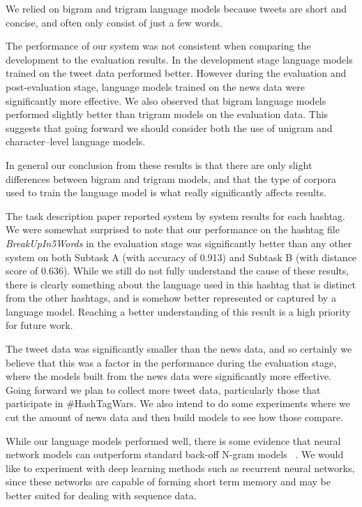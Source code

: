 \documentclass[11pt,a4paper]{article}
\begin{document}
We relied on bigram and trigram language models because 
tweets are short and concise, and often only consist of just
a few words. 

The performance of our system was not consistent when
comparing the development to the evaluation results.
In the development stage language models trained on the
tweet data performed better.
However during the evaluation and post-evaluation stage, 
language models trained on the news data were 
significantly more effective. We also observed that
bigram language models performed slightly better than
trigram models on the evaluation data. This suggests
that going forward we should consider both the use of
unigram and character--level language models. 

In general our 
conclusion from these results is that there are only 
slight differences between bigram and trigram models,
and that the type of corpora used to train the language
model is what really significantly affects results. 

The task description paper \cite{PotashRR17} 
reported system by system results for each hashtag. 
We were somewhat surprised to note that our 
performance on the hashtag file 
\textit{BreakUpIn5Words} in the evaluation 
stage was significantly 
better than any other  system on both Subtask A 
(with accuracy of 0.913) and Subtask B 
(with distance score of 0.636). While we still do not 
fully understand the cause of these results, there is clearly
something about the language used in this hashtag that
is distinct from the other hashtags, and is somehow better
represented or captured by a language model. Reaching a better
understanding of this  result is a high priority for future work. 

The tweet data was significantly smaller than the news data, and
so certainly we believe that this was a factor in the performance
during the evaluation stage, where the models built from the news
data were significantly more effective. Going forward we plan to
collect more tweet data, particularly those that participate in 
\#HashTagWars. We also intend to do some experiments where we 
cut the amount of news data and then build models to see how 
those compare. 

While our language models performed well, there
is some evidence that neural network models
can outperform 
standard back-off N-gram models ~\cite{mikolov2011extensions}. 
We would like to experiment with deep learning methods such 
as recurrent neural networks, since 
these networks are capable of 
forming short term memory and may be better suited for dealing 
with sequence data. 



\end{document}
